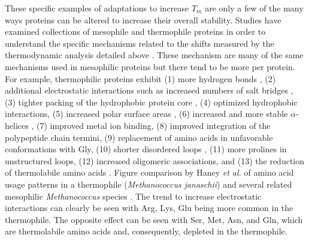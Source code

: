 These specific examples of adaptations to increase ${T}_{m}$ are only a few of
the many ways proteins can be altered to increase their overall stability.
Studies have examined collections of mesophile and thermophile proteins in
order to understand the specific mechanisms related to the shifts measured by
the thermodynamic analysis detailed above \cite{jaenicke1998spe}.  These
mechanism are many of the same mechanisms used in mesophilic proteins but there
tend to be more per protein.  For example, thermophilic proteins exhibit (1)
more hydrogen bonds \cite{PMID_11577980}, (2) additional electrostatic
interactions such as increased numbers of salt bridges \cite{beeby_31,PMID_10097079},
(3) tighter packing of the hydrophobic protein core \cite{beeby_29}, (4)
optimized hydrophobic interactions, (5) increased polar surface areas
\cite{PMID_10940293}, (6) increased and more stable $\alpha$-helices
\cite{PMID_11577980}, (7) improved metal ion binding, (8) improved integration
of the polypeptide chain termini, (9) replacement of amino acids in unfavorable
conformations with Gly, (10) shorter disordered loops \cite{thompson1999tel},
(11) more prolines in unstructured loops, (12) increased oligomeric
associations, and (13) the reduction of thermolabile amino acids
\cite{PMID_11577980,PMID_10097079}. Figure %
comparison by Haney \emph{et al.} of amino acid usage patterns in a thermophile
(\emph{Methanococcus janaschii}) and several related mesophilic
\emph{Methanococcus} species \cite{PMID_10097079}.  The trend to increase electrostatic interactions
can clearly be seen with Arg, Lys, Glu being more common in the thermophile.
The opposite effect can be seen with Ser, Met, Asn, and Gln, which are
thermolabile amino acids and, consequently, depleted in the thermophile.



